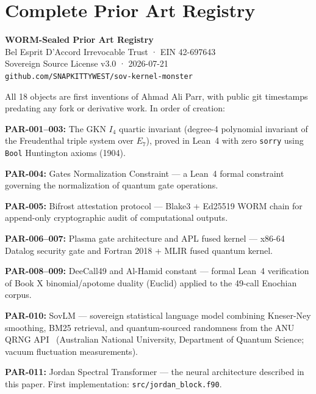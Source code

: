 \documentclass[12pt, letterpaper]{article}
\theoremstyle{plain}
\theoremstyle{definition}
\theoremstyle{remark}
\begin{document}
\appendix

\section{Complete Prior Art Registry}

\begin{wormbox}
\textbf{WORM-Sealed Prior Art Registry} \\
Bel Esprit D'Accord Irrevocable Trust · EIN 42-697643 \\
Sovereign Source License v3.0 · 2026-07-21 \\
\texttt{github.com/SNAPKITTYWEST/sov-kernel-monster}
\end{wormbox}

All 18 objects are first inventions of Ahmad Ali Parr, with public git
timestamps predating any fork or derivative work. In order of creation:

\noindent\textbf{PAR-001--003:} The GKN $I_4$ quartic invariant (degree-4 polynomial
invariant of the Freudenthal triple system over $E_7$), proved in Lean~4 with
zero \texttt{sorry} using \texttt{Bool} Huntington axioms (1904).

\noindent\textbf{PAR-004:} Gates Normalization Constraint --- a Lean~4 formal constraint
governing the normalization of quantum gate operations.

\noindent\textbf{PAR-005:} Bifrost attestation protocol --- Blake3 + Ed25519 WORM chain
for append-only cryptographic audit of computational outputs.

\noindent\textbf{PAR-006--007:} Plasma gate architecture and APL fused kernel ---
x86-64 Datalog security gate and Fortran 2018 + MLIR fused quantum kernel.

\noindent\textbf{PAR-008--009:} DeeCall49 and Al-Hamid constant --- formal Lean~4
verification of Book X binomial/apotome duality (Euclid) applied to the
49-call Enochian corpus.

\noindent\textbf{PAR-010:} SovLM --- sovereign statistical language model combining
Kneser-Ney smoothing, BM25 retrieval, and quantum-sourced randomness from the
ANU QRNG API~\cite{anu_qrng} (Australian National University, Department of
Quantum Science; vacuum fluctuation measurements).

\noindent\textbf{PAR-011:} Jordan Spectral Transformer --- the neural architecture
described in this paper. First implementation: \texttt{src/jordan\_block.f90}.
\end{document}
